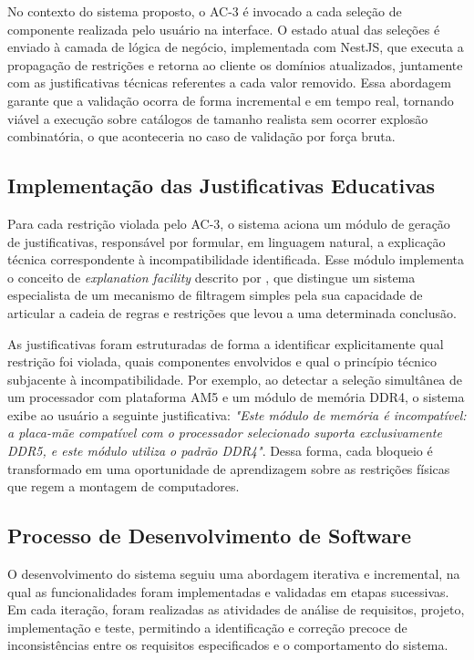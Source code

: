 No contexto do sistema proposto, o AC-3 é invocado a cada seleção de componente realizada pelo usuário na interface. O estado
atual das seleções é enviado à camada de lógica de negócio, implementada com NestJS, que executa a propagação de restrições e
retorna ao cliente os domínios atualizados, juntamente com as justificativas técnicas referentes a cada valor removido.
Essa abordagem garante que a validação ocorra de forma incremental e em tempo real, tornando viável a execução sobre catálogos
de tamanho realista sem ocorrer explosão combinatória, o que aconteceria no caso de validação por força bruta.

\subsection{Implementação das Justificativas Educativas}
Para cada restrição violada pelo AC-3, o sistema aciona um módulo de geração de justificativas, responsável por formular,
em linguagem natural, a explicação técnica correspondente à incompatibilidade identificada. Esse módulo implementa o conceito de
\textit{explanation facility} descrito por \textcite{Clancey1983}, que distingue um sistema especialista de um mecanismo de filtragem
simples pela sua capacidade de articular a cadeia de regras e restrições que levou a uma determinada conclusão.

As justificativas foram estruturadas de forma a identificar explicitamente qual restrição foi violada, quais componentes envolvidos
e qual o princípio técnico subjacente à incompatibilidade. Por exemplo, ao detectar a seleção simultânea de um processador com
plataforma AM5 e um módulo de memória DDR4, o sistema exibe ao usuário a seguinte justificativa: \textit{"Este módulo de memória é
  incompatível: a placa-mãe compatível com o processador selecionado suporta exclusivamente DDR5, e este módulo utiliza o padrão DDR4"}.
Dessa forma, cada bloqueio é transformado em uma oportunidade de aprendizagem sobre as restrições físicas que regem a montagem de
computadores.

\subsection{Processo de Desenvolvimento de Software}
O desenvolvimento do sistema seguiu uma abordagem iterativa e incremental, na qual as funcionalidades foram implementadas e validadas
em etapas sucessivas. Em cada iteração, foram realizadas as atividades de análise de requisitos, projeto, implementação e teste, permitindo
a identificação e correção precoce de inconsistências entre os requisitos especificados e o comportamento do sistema.

